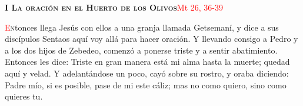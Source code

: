\noindent\textbf{\textsc{I La oración en el Huerto de los Olivos}}\hfill\textcolor{red}{Mt 26, 36-39}

\vspace{0.25em}

\lettrine[lines=2]{\textcolor{red}{E}}ntonces llega Jesús con ellos a una granja llamada Getsemaní, y dice a sus discípulos Sentaos aquí voy allá para
hacer oración. Y llevando consigo a Pedro y a los dos hijos de Zebedeo, comenzó a ponerse triste y a sentir abatimiento. Entonces les dice: Triste en gran
manera está mi alma hasta la muerte; quedad aquí y velad. Y adelantándose un poco, cayó sobre su rostro, y oraba diciendo: Padre mío, si es posible, 
pase de mi este cáliz; mas no como quiero, sino como quieres tu.